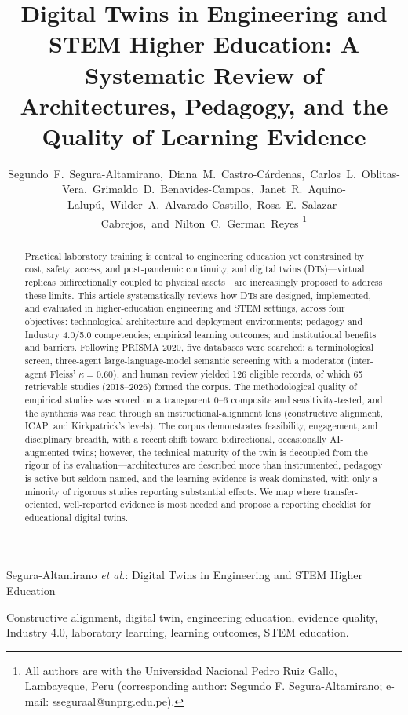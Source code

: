 \documentclass[journal]{IEEEtran}
\begin{document}
\title{Digital Twins in Engineering and STEM Higher Education: A Systematic Review of Architectures, Pedagogy, and the Quality of Learning Evidence}

\author{Segundo~F.~Segura-Altamirano,~Diana~M.~Castro-Cárdenas,~Carlos~L.~Oblitas-Vera,~Grimaldo~D.~Benavides-Campos,~Janet~R.~Aquino-Lalupú,~Wilder~A.~Alvarado-Castillo,~Rosa~E.~Salazar-Cabrejos,~and~Nilton~C.~German~Reyes%
\thanks{All authors are with the Universidad Nacional Pedro Ruiz Gallo, Lambayeque, Peru (corresponding author: Segundo F. Segura-Altamirano; e-mail: sseguraal@unprg.edu.pe).}}

%
{Segura-Altamirano \MakeLowercase{\textit{et al.}}: Digital Twins in Engineering and STEM Higher Education}

\maketitle

\begin{abstract}
Practical laboratory training is central to engineering education yet constrained by cost, safety, access, and post-pandemic continuity, and digital twins (DTs)---virtual replicas bidirectionally coupled to physical assets---are increasingly proposed to address these limits. This article systematically reviews how DTs are designed, implemented, and evaluated in higher-education engineering and STEM settings, across four objectives: technological architecture and deployment environments; pedagogy and Industry 4.0/5.0 competencies; empirical learning outcomes; and institutional benefits and barriers. Following PRISMA 2020, five databases were searched; a terminological screen, three-agent large-language-model semantic screening with a moderator (inter-agent Fleiss' $\kappa = 0.60$), and human review yielded 126 eligible records, of which 65 retrievable studies (2018--2026) formed the corpus. The methodological quality of empirical studies was scored on a transparent 0--6 composite and sensitivity-tested, and the synthesis was read through an instructional-alignment lens (constructive alignment, ICAP, and Kirkpatrick's levels). The corpus demonstrates feasibility, engagement, and disciplinary breadth, with a recent shift toward bidirectional, occasionally AI-augmented twins; however, the technical maturity of the twin is decoupled from the rigour of its evaluation---architectures are described more than instrumented, pedagogy is active but seldom named, and the learning evidence is weak-dominated, with only a minority of rigorous studies reporting substantial effects. We map where transfer-oriented, well-reported evidence is most needed and propose a reporting checklist for educational digital twins.
\end{abstract}

\begin{IEEEkeywords}
Constructive alignment, digital twin, engineering education, evidence quality, Industry 4.0, laboratory learning, learning outcomes, STEM education.
\end{IEEEkeywords}





\end{document}
